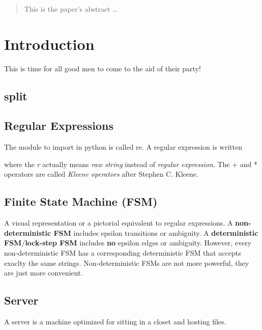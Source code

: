 \documentclass[12pt]{article}
\begin{document}
\maketitle

\begin{abstract}
This is the paper's abstract \ldots
\end{abstract}

\section{Introduction}
This is time for all good men to come to the aid of their party!

\subsection{split}
\scriptsize


\subsection*{Regular Expressions}
The module to import in python is called re. A regular expression is written



where the \emph{r} actually means \emph{raw string} instead of \emph{regular expression}. The + and * operators are called \emph{Kleene operators} after Stephen C. Kleene.

\subsection*{Finite State Machine (FSM)}
A visual representation or a pictorial equivalent to regular expressions. A \textbf{non-deterministic FSM} includes epsilon transitions or ambiguity. 
A \textbf{deterministic FSM}/\textbf{lock-step FSM} includes \textbf{no} epsilon edges or ambiguity. However, every non-deterministic FSM has a corresponding deterministic FSM that accepts exaclty the same strings. Non-deterministic FSMs are not more powerful, they are just more convenient.

\subsection*{Server}
A server is a machine optimized for sitting in a closet and hosting files.
\end{document}
